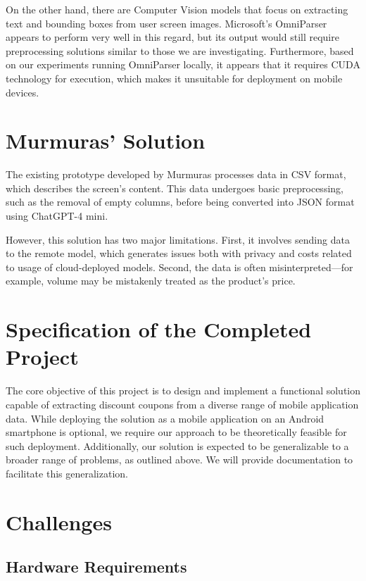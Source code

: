 \documentclass[12pt]{article}
\begin{document}
On the other hand, there are Computer Vision models that focus on extracting text and bounding boxes from user screen images. Microsoft's OmniParser \cite{lu2024omniparserpurevisionbased} appears to perform very well in this regard, but its output would still require preprocessing solutions similar to those we are investigating. Furthermore, based on our experiments running OmniParser locally, it appears that it requires CUDA technology for execution, which makes it unsuitable for deployment on mobile devices.


\section*{Murmuras' Solution}
The existing prototype developed by Murmuras processes data in CSV format, which describes the screen's content. This data undergoes basic preprocessing, such as the removal of empty columns, before being converted into JSON format using ChatGPT-4 mini.

However, this solution has two major limitations. First, it involves sending data to the remote model, which generates issues both with privacy and costs related to usage of cloud-deployed models. Second, the data is often misinterpreted—for example, volume may be mistakenly treated as the product's price.

\section*{Specification of the Completed Project}
The core objective of this project is to design and implement a functional solution capable of extracting discount coupons from a diverse range of mobile application data. While deploying the solution as a mobile application on an Android smartphone is optional, we require our approach to be theoretically feasible for such deployment. Additionally, our solution is expected to be generalizable to a broader range of problems, as outlined above. We will provide documentation to facilitate this generalization.

\section*{Challenges}

\subsection*{Hardware Requirements}
\end{document}
